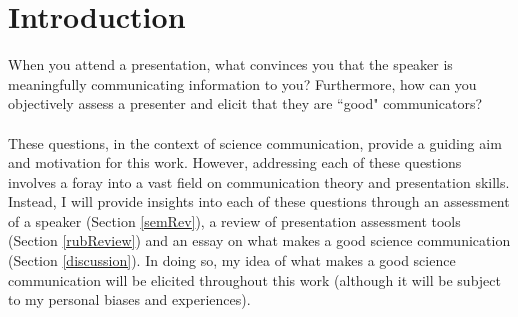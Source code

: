 \section{Introduction}

When you attend a presentation, what convinces you that the speaker is meaningfully communicating
information to you?
Furthermore, how can you objectively assess a presenter and elicit that they are ``good"
communicators?\\
\\
These questions, in the context of science communication, provide a guiding aim and motivation for
this work.
However, addressing each of these questions involves a foray into a vast field on
communication theory and presentation skills.
Instead, I will provide insights into each of these questions through an assessment of a speaker
(Section \ref{semRev}), a review of presentation assessment tools (Section \ref{rubReview}) and an
essay on what makes a good science communication (Section \ref{discussion}).
In doing so, my idea of what makes a good science communication will be elicited throughout this
work (although it will be subject to my personal biases and experiences).

